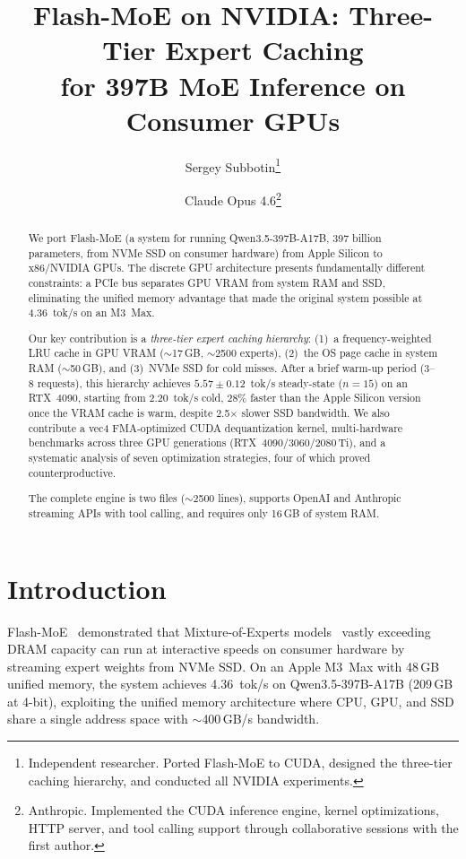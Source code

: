 \documentclass[11pt]{article}
\title{Flash-MoE on NVIDIA: Three-Tier Expert Caching\\for 397B MoE Inference on Consumer GPUs}
\author{
    Sergey Subbotin\thanks{Independent researcher. Ported Flash-MoE to CUDA, designed the three-tier caching hierarchy, and conducted all NVIDIA experiments.}
    \and
    Claude Opus 4.6\thanks{Anthropic. Implemented the CUDA inference engine, kernel optimizations, HTTP server, and tool calling support through collaborative sessions with the first author.}
}
\date{}
\begin{document}
\maketitle

\begin{abstract}
We port Flash-MoE (a system for running Qwen3.5-397B-A17B, 397 billion parameters, from NVMe SSD on consumer hardware) from Apple Silicon to x86/NVIDIA GPUs. The discrete GPU architecture presents fundamentally different constraints: a PCIe bus separates GPU VRAM from system RAM and SSD, eliminating the unified memory advantage that made the original system possible at 4.36~tok/s on an M3~Max.

Our key contribution is a \emph{three-tier expert caching hierarchy}: (1)~a frequency-weighted LRU cache in GPU VRAM ($\sim$17\,GB, $\sim$2500 experts), (2)~the OS page cache in system RAM ($\sim$50\,GB), and (3)~NVMe SSD for cold misses. After a brief warm-up period (3--8 requests), this hierarchy achieves $5.57 \pm 0.12$~tok/s steady-state ($n=15$) on an RTX~4090, starting from 2.20~tok/s cold, 28\% faster than the Apple Silicon version once the VRAM cache is warm, despite 2.5$\times$ slower SSD bandwidth. We also contribute a vec4 FMA-optimized CUDA dequantization kernel, multi-hardware benchmarks across three GPU generations (RTX~4090/3060/2080\,Ti), and a systematic analysis of seven optimization strategies, four of which proved counterproductive.

The complete engine is two files ($\sim$2500 lines), supports OpenAI and Anthropic streaming APIs with tool calling, and requires only 16\,GB of system RAM.
\end{abstract}

\section{Introduction}

Flash-MoE~\cite{flashmoe} demonstrated that Mixture-of-Experts models~\cite{mixtral,deepseekv3} vastly exceeding DRAM capacity can run at interactive speeds on consumer hardware by streaming expert weights from NVMe SSD. On an Apple M3~Max with 48\,GB unified memory, the system achieves 4.36~tok/s on Qwen3.5-397B-A17B (209\,GB at 4-bit), exploiting the unified memory architecture where CPU, GPU, and SSD share a single address space with $\sim$400\,GB/s bandwidth.
\end{document}
